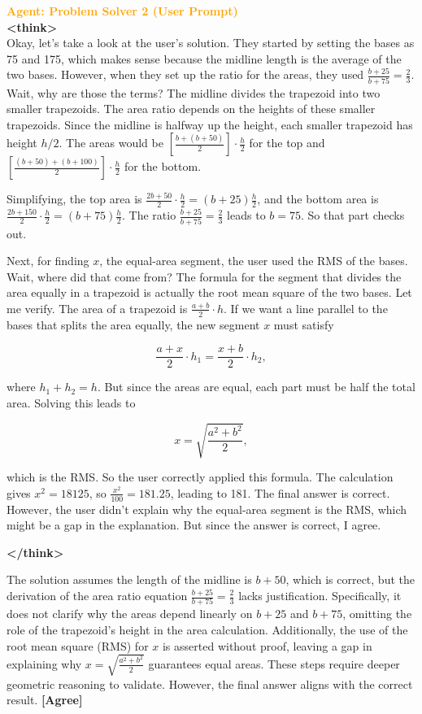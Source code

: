 \begin{tcolorbox}[
  title=Multiagent Collaborative Reasoning Trace Data Sample,
  breakable,
  colback=white,
  colframe=black
]
\textcolor{orange}{\textbf{Agent: Problem Solver 2 (User Prompt)}} \\
\textbf{\textless think\textgreater} \\
Okay, let's take a look at the user's solution. They started by setting the bases as 75 and 175, which makes sense because the midline length is the average of the two bases. However, when they set up the ratio for the areas, they used \( \frac{b + 25}{b + 75} = \frac{2}{3} \). Wait, why are those the terms? The midline divides the trapezoid into two smaller trapezoids. The area ratio depends on the heights of these smaller trapezoids. Since the midline is halfway up the height, each smaller trapezoid has height \( h/2 \). The areas would be \( \left[\frac{b + (b + 50)}{2}\right] \cdot \frac{h}{2} \) for the top and \( \left[\frac{(b + 50) + (b + 100)}{2}\right] \cdot \frac{h}{2} \) for the bottom. 

Simplifying, the top area is \( \frac{2b + 50}{2} \cdot \frac{h}{2} = (b + 25)\frac{h}{2} \), and the bottom area is \( \frac{2b + 150}{2} \cdot \frac{h}{2} = (b + 75)\frac{h}{2} \). The ratio \( \frac{b + 25}{b + 75} = \frac{2}{3} \) leads to \( b = 75 \). So that part checks out.

Next, for finding \( x \), the equal-area segment, the user used the RMS of the bases. Wait, where did that come from? The formula for the segment that divides the area equally in a trapezoid is actually the root mean square of the two bases. Let me verify. The area of a trapezoid is \( \frac{a + b}{2} \cdot h \). If we want a line parallel to the bases that splits the area equally, the new segment \( x \) must satisfy 

\[
\frac{a + x}{2} \cdot h_1 = \frac{x + b}{2} \cdot h_2,
\]

where \( h_1 + h_2 = h \). But since the areas are equal, each part must be half the total area. Solving this leads to 

\[
x = \sqrt{\frac{a^2 + b^2}{2}},
\]

which is the RMS. So the user correctly applied this formula. The calculation gives \( x^2 = 18125 \), so \( \frac{x^2}{100} = 181.25 \), leading to 181. The final answer is correct. However, the user didn't explain why the equal-area segment is the RMS, which might be a gap in the explanation. But since the answer is correct, I agree.

\textbf{\textless /think\textgreater} 

The solution assumes the length of the midline is \( b + 50 \), which is correct, but the derivation of the area ratio equation \( \frac{b + 25}{b + 75} = \frac{2}{3} \) lacks justification. Specifically, it does not clarify why the areas depend linearly on \( b + 25 \) and \( b + 75 \), omitting the role of the trapezoid's height in the area calculation. Additionally, the use of the root mean square (RMS) for \( x \) is asserted without proof, leaving a gap in explaining why \( x = \sqrt{\frac{a^2 + b^2}{2}} \) guarantees equal areas. These steps require deeper geometric reasoning to validate. However, the final answer aligns with the correct result. \textbf{[Agree]}


\end{tcolorbox}
